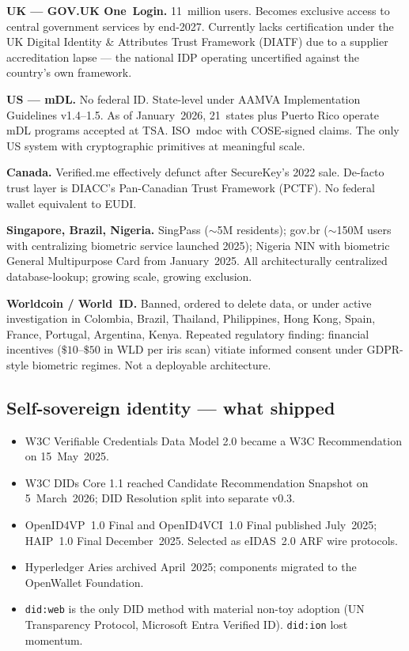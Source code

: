 \documentclass[11pt,a4paper,parskip=half-,DIV=12,headings=standardclasses]{scrartcl}
\theoremstyle{ncthm}
\theoremstyle{ncdef}
\begin{document}
\textbf{UK --- GOV.UK One~Login.} 11~million users. Becomes exclusive
access to central government services by end-2027. Currently lacks
certification under the UK Digital Identity \& Attributes Trust
Framework (DIATF) due to a supplier accreditation lapse --- the
national IDP operating uncertified against the country's own framework.

\textbf{US --- mDL.} No federal ID. State-level under AAMVA
Implementation Guidelines v1.4--1.5. As of January~2026, 21~states
plus Puerto Rico operate mDL programs accepted at TSA. ISO~mdoc with
COSE-signed claims. The only US system with cryptographic primitives
at meaningful scale.

\textbf{Canada.} Verified.me effectively defunct after SecureKey's
2022 sale. De-facto trust layer is DIACC's Pan-Canadian Trust
Framework (PCTF). No federal wallet equivalent to EUDI.

\textbf{Singapore, Brazil, Nigeria.} SingPass ($\sim$5M residents);
gov.br ($\sim$150M users with centralizing biometric service launched
2025); Nigeria NIN with biometric General Multipurpose Card from
January~2025. All architecturally centralized database-lookup; growing
scale, growing exclusion.

\textbf{Worldcoin / World~ID.} Banned, ordered to delete data, or under
active investigation in Colombia, Brazil, Thailand, Philippines, Hong
Kong, Spain, France, Portugal, Argentina, Kenya. Repeated
regulatory finding: financial incentives ($\$10$--$\$50$ in WLD per
iris scan) vitiate informed consent under GDPR-style biometric
regimes. Not a deployable architecture.

\subsection{Self-sovereign identity --- what shipped}

\begin{itemize}
\item W3C Verifiable Credentials Data Model 2.0 became a W3C
  Recommendation on 15~May~2025.
\item W3C DIDs Core 1.1 reached Candidate Recommendation Snapshot on
  5~March~2026; DID Resolution split into separate v0.3.
\item OpenID4VP~1.0 Final and OpenID4VCI~1.0 Final published
  July~2025; HAIP~1.0 Final December~2025. Selected as eIDAS~2.0
  ARF wire protocols.
\item Hyperledger Aries archived April~2025; components migrated to
  the OpenWallet Foundation.
\item \texttt{did:web} is the only DID method with material non-toy
  adoption (UN Transparency Protocol, Microsoft Entra Verified ID).
  \texttt{did:ion} lost momentum.
\end{itemize}
\end{document}
